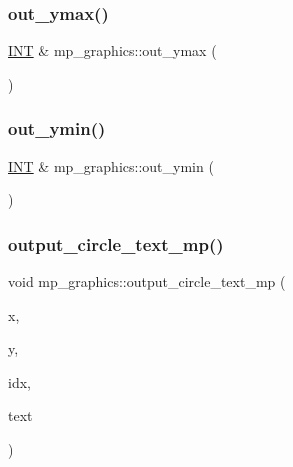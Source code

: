 \subsubsection{\texorpdfstring{out\+\_\+ymax()}{out\_ymax()}}
{\footnotesize\ttfamily \mbox{\hyperlink{galois_8h_a09fddde158a3a20bd2dcadb609de11dc}{I\+NT}} \& mp\+\_\+graphics\+::out\+\_\+ymax (\begin{DoxyParamCaption}{ }\end{DoxyParamCaption})}

\mbox{\label{classmp__graphics_a01d97c3ec8360a3c2244aa895e2b9c9e}} 
\subsubsection{\texorpdfstring{out\+\_\+ymin()}{out\_ymin()}}
{\footnotesize\ttfamily \mbox{\hyperlink{galois_8h_a09fddde158a3a20bd2dcadb609de11dc}{I\+NT}} \& mp\+\_\+graphics\+::out\+\_\+ymin (\begin{DoxyParamCaption}{ }\end{DoxyParamCaption})}

\mbox{\label{classmp__graphics_a26ee112bf3b6577bc197456632fc5d94}} 
\subsubsection{\texorpdfstring{output\+\_\+circle\+\_\+text\+\_\+mp()}{output\_circle\_text\_mp()}}
{\footnotesize\ttfamily void mp\+\_\+graphics\+::output\+\_\+circle\+\_\+text\+\_\+mp (\begin{DoxyParamCaption}\item[{\mbox{\hyperlink{galois_8h_a09fddde158a3a20bd2dcadb609de11dc}{I\+NT}}}]{x,  }\item[{\mbox{\hyperlink{galois_8h_a09fddde158a3a20bd2dcadb609de11dc}{I\+NT}}}]{y,  }\item[{\mbox{\hyperlink{galois_8h_a09fddde158a3a20bd2dcadb609de11dc}{I\+NT}}}]{idx,  }\item[{const char $\ast$}]{text }\end{DoxyParamCaption})}

